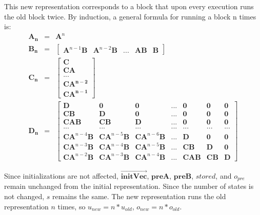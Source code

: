     This new representation corresponds to a block that upon
every execution runs the old block twice. By induction, a general
formula for running a block n times is:
\begin{eqnarray}
\mathbf{A_n} & = & \mathbf{A}^n \\
\mathbf{B_n} & = & \left [ \begin{array} {ccccc} \mathbf{A}^{n-1}
\mathbf{B} & \mathbf{A}^{n-2} \mathbf{B} & ...  & \mathbf{AB} &
\mathbf{B} \end{array} \right ] \\
\mathbf{C_n} & = & \left [ \begin{array} {c} \mathbf{C} \\
\mathbf{CA} \\
... \\
\mathbf{CA^{n-2}} \\
\mathbf{CA^{n-1}} \end{array} \right ] \\
\mathbf{D_n} & = & \left [ \begin{array} {ccccccc}
\mathbf{D} & \mathbf{0} & \mathbf{0} & ... & \mathbf{0} & \mathbf{0} & \mathbf{0} \\
\mathbf{CB} & \mathbf{D} & \mathbf{0} & ... & \mathbf{0} & \mathbf{0} & \mathbf{0} \\
\mathbf{CAB} & \mathbf{CB} & \mathbf{D} & ... & \mathbf{0} & \mathbf{0} & \mathbf{0} \\
... & ... & ... & ... & ... & ... & ... \\
\mathbf{CA}^{n-4} \mathbf{B} & \mathbf{CA}^{n-5} \mathbf{B} &
\mathbf{CA}^{n-6} \mathbf{B} & ... & \mathbf{D} & \mathbf{0} & \mathbf{0} \\
\mathbf{CA}^{n-3} \mathbf{B} & \mathbf{CA}^{n-4} \mathbf{B} &
\mathbf{CA}^{n-5} \mathbf{B} & ... & \mathbf{CB} & \mathbf{D} & \mathbf{0} \\
\mathbf{CA}^{n-2} \mathbf{B} & \mathbf{CA}^{n-3} \mathbf{B} &
\mathbf{CA}^{n-4} \mathbf{B} & ... & \mathbf{CAB} & \mathbf{CB} &
\mathbf{D} \end{array} \right ]
\end{eqnarray}

    Since initializations are not affected, $\overrightarrow{\mathbf{initVec}}$,
$\mathbf{preA}$, $\mathbf{preB}$, $stored$, and $o_{pre}$ remain
unchanged from the initial representation. Since the number of
states is not changed, $s$ remains the same. The new
representation runs the old representation $n$ times, so $u_{new}
= n * u_{old}$, $o_{new} = n * o_{old}$.

